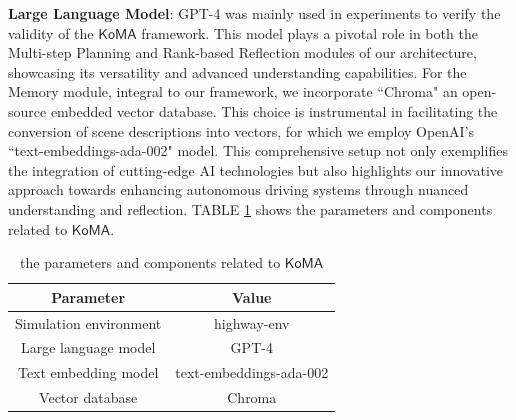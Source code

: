 \documentclass[lettersize,journal]{IEEEtran}
\begin{document}
\textbf{Large Language Model}: GPT-4\cite{achiam2023gpt} was mainly used in experiments to verify the validity of the $\mathsf{KoMA}$ framework. This model plays a pivotal role in both the Multi-step Planning and Rank-based Reflection modules of our architecture, showcasing its versatility and advanced understanding capabilities. For the Memory module, integral to our framework, we incorporate ``Chroma" an open-source embedded vector database. This choice is instrumental in facilitating the conversion of scene descriptions into vectors, for which we employ OpenAI's ``text-embeddings-ada-002" model. This comprehensive setup not only exemplifies the integration of cutting-edge AI technologies but also highlights our innovative approach towards enhancing autonomous driving systems through nuanced understanding and reflection. TABLE \ref{tab:table1} shows the parameters and components related to $\mathsf{KoMA}$.
 
\begin{table}[h]
\caption{the parameters and components related to $\mathsf{KoMA}$\label{tab:table1}}
\centering
\begin{tabular}{|c||c|}
\hline
\textbf{Parameter} & \textbf{Value}\\
\hline
Simulation environment & highway-env\cite{leurent2018environment}\\
\hline
Large language model & GPT-4\cite{achiam2023gpt}\\
\hline
Text embedding model & text-embeddings-ada-002\\
\hline
Vector database & Chroma\\
\hline
\end{tabular}
\end{table}
\end{document}
